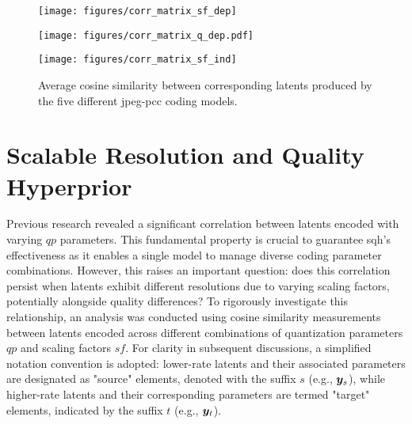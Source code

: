 \begin{figure*}[!t]
    \centering
    \begin{minipage}[c]{.28\textwidth}
    \centering
    \texttt{[image: figures/corr\_matrix\_sf\_dep]}
    \label{fig:corr_matrix_sf_seq}
    \end{minipage}    
    \hspace{1cm}
    \begin{minipage}[c]{.28\textwidth}
    \centering
    \texttt{[image: figures/corr\_matrix\_q\_dep.pdf]}
    \label{fig:corr_matrix_q_seq}
    \end{minipage}    
    \hspace{1cm}
    \begin{minipage}[c]{.28\textwidth}
    \centering
    \texttt{[image: figures/corr\_matrix\_sf\_ind]}
    \label{fig:corr_matrix_sf_ind}
    \end{minipage}
    \label{fig:corr_matrix_sf}
    \caption{Average cosine similarity between corresponding latents produced by the five different \gls{jpeg-pcc} coding models.}
\end{figure*}

\section{Scalable Resolution and Quality Hyperprior}
\label{sec:extending_sqh}
Previous research \cite{mari2024point} revealed a significant correlation between latents encoded with varying $qp$ parameters. This fundamental property is crucial to guarantee \gls{sqh}'s effectiveness as it enables a single model to manage diverse coding parameter combinations. However, this raises an important question: does this correlation persist when latents exhibit different resolutions due to varying scaling factors, potentially alongside quality differences? 
To rigorously investigate this relationship, an analysis was conducted using cosine similarity measurements between latents encoded across different combinations of quantization parameters $qp$ and scaling factors $sf$. For clarity in subsequent discussions, a simplified notation convention is adopted: lower-rate latents and their associated parameters are designated as "source" elements, denoted with the suffix $s$ (e.g., $\y_s$), while higher-rate latents and their corresponding parameters are termed "target" elements, indicated by the suffix $t$ (e.g., $\y_t$).

